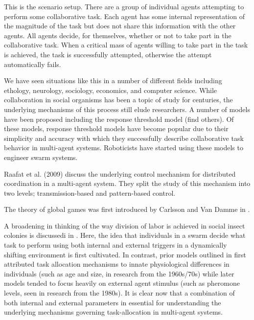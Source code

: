 \documentclass{nature}
\begin{document}
This is the scenario setup. There are a group of individual agents attempting to perform some collaborative task. Each agent has some internal representation of the magnitude of the task but does not share this information with the other agents. All agents decide, for themselves, whether or not to take part in the collaborative task. When a critical mass of agents willing to take part in the task is achieved, the task is successfully attempted, otherwise the attempt automatically fails.

We have seen situations like this in a number of different fields including ethology, neurology, sociology, economics, and computer science. While collaboration in social organisms has been a topic of study for centuries, the underlying mechanisms of this process still elude researchers. A number of models have been proposed including the response threshold model (find others). Of these models, response threshold models have become popular due to their simplicity and accuracy with which they successfully describe collaborative task behavior in multi-agent systems. Roboticists have started using these models to engineer swarm systems.

Raafat et al. (2009) discuss the underlying control mechanism for distributed coordination in a multi-agent system. They split the study of this mechanism into two levels; transmission-based and pattern-based control. 


The theory of global games was first introduced by Carlsson and Van Damme in \cite{Carlsson1993}.

A broadening in thinking of the way division of labor is achieved in social insect colonies is discussedi in \cite{Gordon1996}. Here, the idea that individuals in a swarm decide what task to perform using both internal and external triggers in a dynamically shifting environment is first cultivated. In contrast, prior models outlined in \cite{Gordon1996} first attributed task allocation mechanisms to innate physiological differences in individuals (such as age and size, in research from the 1960s/70s) while later models tended to focus heavily on external agent stimulus (such as pheromone levels, seen in research from the 1980s). It is clear now that  a combination of both internal and external parameters in essential for understanding the underlying mechanisms governing task-allocation in multi-agent systems.
\end{document}

